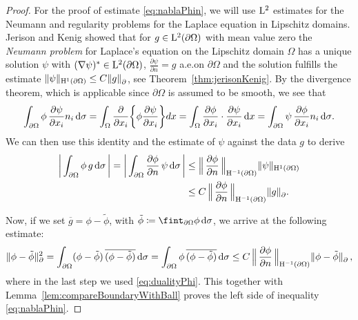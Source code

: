 \begin{proof}
  For the proof of estimate \eqref{eq:nablaPhin}, we will use $\mathrm{L}^2$ estimates for the Neumann and regularity problems for the Laplace equation in Lipschitz domains.
  Jerison and Kenig showed that for $g \in \mathrm{L}^2(\partial\Omega)$ with mean value zero the \emph{Neumann problem} for Laplace's equation on the Lipschitz domain $\Omega$ has a unique solution $\psi$ with  $(\nabla \psi)^* \in \mathrm{L}^2(\partial\Omega)$, $\frac{\partial \psi}{\partial n} = g$ a.e.\@ on $\partial \Omega$ and the solution fulfills the estimate $\|\psi\|_{\mathrm{H}^1(\partial\Omega)} \leq C \|g\|^{}_\partial$, see Theorem~\ref{thm:jerisonKenig}.
  By the divergence theorem, which is applicable since $\partial\Omega$ is assumed to be smooth, we see that
  \begin{align*}
    \int_{\partial\Omega} \phi \, \frac{\partial\psi}{\partial x_i} n_i \, {\operatorname{d}\!{\sigma}}  
    = \int_\Omega \frac{\partial}{\partial x_i} \bigg\{ \phi \frac{\partial\psi}{\partial x_i} \bigg\} d x 
    = \int_\Omega \frac{\partial \phi}{\partial x_i} \cdot \frac{\partial \psi}{\partial x_i} \, {\operatorname{d}\!{x}} 
    = \int_{\partial\Omega} \psi \, \frac{\partial \phi}{\partial x_i} n_i \, {\operatorname{d}\!{\sigma}}.
  \end{align*}
  We can then use this identity and the estimate of $\psi$ against the data $g$ to derive
  \begin{align}
    \label{eq:dualityPhi}
    \bigg| \int_{\partial\Omega} \phi \, g \, {\operatorname{d}\!{\sigma}}\, \bigg|
    =\bigg| \int_{\partial\Omega} \frac{\partial \phi}{\partial n} \, \psi \, {\operatorname{d}\!{\sigma}}\, \bigg|
    &\leq \Big\|\, \frac{\partial \phi}{\partial n}\, \Big\|_{\mathrm{H}^{-1}(\partial\Omega)} \| \psi \|_{\mathrm{H}^1(\partial\Omega)}  \nonumber \\
    &\leq C\, \Big\|\, \frac{\partial \phi}{\partial n} \,\Big\|_{\mathrm{H}^{-1}(\partial\Omega)} \| g\|^{}_\partial.
  \end{align}
  
  Now, if we set $\overline g = \phi - \tilde \phi$, with $\tilde \phi \coloneqq \fint_{\partial\Omega} \phi \d \sigma$, we arrive at the following estimate:
  \begin{align*}
      \| \phi - \tilde\phi \|_\partial^2
    = \int_{\partial\Omega} (\phi - \tilde \phi) \, \overline{(\phi - \tilde\phi)} \, {\operatorname{d}\!{\sigma}} 
    = \int_{\partial\Omega} \phi\, \overline{(\phi - \tilde\phi)} \, {\operatorname{d}\!{\sigma}} 
    \leq C\, \Big\|\, \frac{\partial\phi}{\partial n}\, \Big\|_{\mathrm{H}^{-1}(\partial\Omega)} \|\phi - \tilde \phi\|^{}_\partial\,,
  \end{align*}
  where in the last step we used \eqref{eq:dualityPhi}.
  This together with Lemma~\ref{lem:compareBoundaryWithBall} proves the left side of inequality \eqref{eq:nablaPhin}.


\end{proof}
